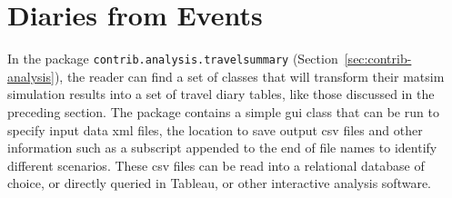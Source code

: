 \section{Diaries from Events}
In the package \lstinline|contrib.analysis.travelsummary| (Section~\ref{sec:contrib-analysis}), the reader can find a set of classes that will transform their \gls{matsim} simulation results into a set of travel diary tables, like those discussed in the preceding section. The package contains a simple \gls{gui} class that can be run to specify input data \gls{xml} files, the location to save output \gls{csv} files and other information such as a subscript appended to the end of file names to identify different scenarios. These \gls{csv} files can be read into a relational database of choice, or directly queried in Tableau, or other interactive analysis software.





